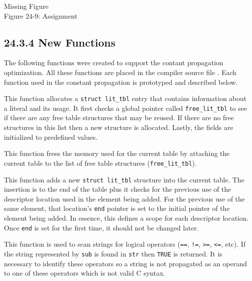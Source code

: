 \bigskip

{\centering{}
  {\color{red}Missing Figure}\\
Figure 24-9: Assignment
\par}

\subsection[24.3.4 New Functions]{24.3.4 New Functions}

The following functions were created to support the contant
propagation optimization. All these functions are placed in the
compiler source file . Each function used in the
constant propagation is prototyped and described below.


This function allocates a \texttt{struct lit\_tbl} entry that contains
information about a literal and its usage. It first checks a global
pointer called \texttt{free\_lit\_tbl} to see if there are any free
table structures that may be reused. If there are no free structures
in this list then a new structure is allocated. Lastly, the fields are
initialized to predefined values.


This function frees the memory used for the current table by attaching
the current table to the list of free table structures
(\texttt{free\_lit\_tbl}).


This function adds a new \texttt{struct lit\_tbl} structure into the current
table. The insertion is to the end of the table plus it checks for the
previous use of the descriptor location used in the element being
added. For the previous use of the same element, that location's
\texttt{end} pointer is set to the initial pointer of the element
being added. In essence, this defines a scope for each descriptor
location. Once \texttt{end} is set for the first time, it should not
be changed later.


This function is used to scan strings for logical operators
(\texttt{==}, \texttt{!=}, \texttt{{\textgreater}=},
\texttt{{\textless}=}, etc). If the string represented by \texttt{sub}
is found in \texttt{str} then \texttt{TRUE} is returned. It is
necessary to identify these operators so a string is not propagated as
an operand to one of these operators which is not valid C syntax.

